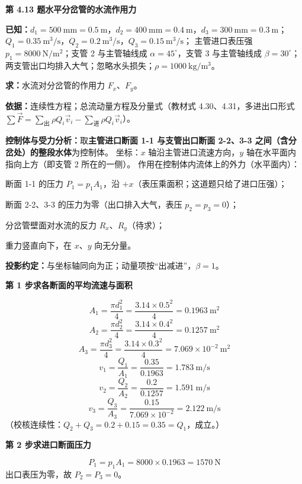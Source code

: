\noindent\textbf{第 4.13 题\quad 水平分岔管的水流作用力}

\begin{jie}
\textbf{已知：}$d_1=500\ \mathrm{mm}=0.5\ \mathrm{m}$，$d_2=400\ \mathrm{mm}=0.4\ \mathrm{m}$，$d_3=300\ \mathrm{mm}=0.3\ \mathrm{m}$；
$Q_1=0.35\ \mathrm{m^3/s}$，$Q_2=0.2\ \mathrm{m^3/s}$，$Q_3=0.15\ \mathrm{m^3/s}$；
主管进口表压强 $p_1=8000\ \mathrm{N/m^2}$；支管 2 与主管轴线成 $\alpha=45^\circ$，支管 3 与主管轴线成 $\beta=30^\circ$；
两支管出口均排入大气；忽略水头损失；$\rho=1000\ \mathrm{kg/m^3}$。

\textbf{求：}水流对分岔管的作用力 $F_x$、$F_y$。

\textbf{依据：}连续性方程；总流动量方程及分量式（教材式 4.30、4.31，多进出口形式
$\sum\vec F=\sum\limits_{\text{出}}\rho Q_i\vec v_i-\sum\limits_{\text{进}}\rho Q_i\vec v_i$）。

\textbf{控制体与受力分析：}取\textbf{主管进口断面 1-1 与支管出口断面 2-2、3-3 之间（含分岔处）的整段水体}为控制体。
坐标：$x$ 轴沿主管进口流速方向，$y$ 轴在水平面内指向上方（即支管 2 所在的一侧）。
作用在控制体内流体上的外力（水平面内）：
\begin{xiaowen}
\item 断面 1-1 的压力 $P_1=p_1A_1$，沿 $+x$（表压乘面积；这道题只给了进口压强）；
\item 断面 2-2、3-3 的压力为零（出口排入大气，表压 $p_2=p_3=0$）；
\item 分岔管壁面对水流的反力 $R_x$、$R_y$（待求）；
\item 重力竖直向下，在 $x$、$y$ 向无分量。
\end{xiaowen}
\textbf{投影约定：}与坐标轴同向为正；动量项按“出减进”，$\beta=1$。

\textbf{第 1 步\quad 求各断面的平均流速与面积}

\[ A_1=\frac{\pi d_1^2}{4}=\frac{3.14\times0.5^2}{4}=0.1963\ \mathrm{m^2} \]
\[ A_2=\frac{\pi d_2^2}{4}=\frac{3.14\times0.4^2}{4}=0.1257\ \mathrm{m^2} \]
\[ A_3=\frac{\pi d_3^2}{4}=\frac{3.14\times0.3^2}{4}=7.069\times10^{-2}\ \mathrm{m^2} \]
\[ v_1=\frac{Q_1}{A_1}=\frac{0.35}{0.1963}=1.783\ \mathrm{m/s} \]
\[ v_2=\frac{Q_2}{A_2}=\frac{0.2}{0.1257}=1.591\ \mathrm{m/s} \]
\[ v_3=\frac{Q_3}{A_3}=\frac{0.15}{7.069\times10^{-2}}=2.122\ \mathrm{m/s} \]
（校核连续性：$Q_2+Q_3=0.2+0.15=0.35=Q_1$，成立。）

\textbf{第 2 步\quad 求进口断面压力}

\[ P_1=p_1A_1=8000\times0.1963=1570\ \mathrm{N} \]
出口表压为零，故 $P_2=P_3=0$。


\end{jie}
